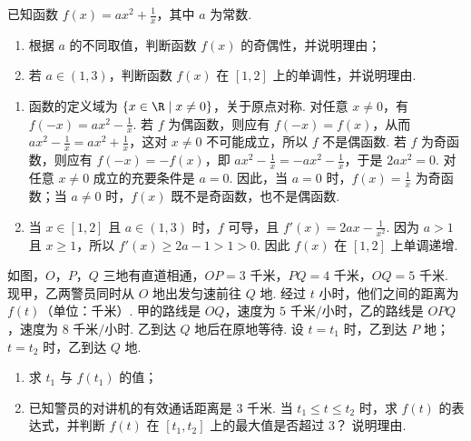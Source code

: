 \begin{problem}
已知函数 \( f(x) = ax^2 + \frac{1}{x} \)，其中 \( a \) 为常数.
\begin{enumerate}
\item 根据 \(a\) 的不同取值，判断函数 \(f(x)\) 的奇偶性，并说明理由；
\item 若 \(a \in (1,3)\)，判断函数 \(f(x)\) 在 \([1,2]\) 上的单调性，并说明理由.
\end{enumerate}
\end{problem}

\begin{solution}
\begin{enumerate}
\item 函数的定义域为 \(\{x\in\R\mid x\neq0\}\)，关于原点对称. 对任意 \(x\neq0\)，有 \(f(-x)=ax^{2}-\frac{1}{x}\). 若 \(f\) 为偶函数，则应有 \(f(-x)=f(x)\)，从而 \(ax^{2}-\frac{1}{x}=ax^{2}+\frac{1}{x}\)，这对 \(x\neq0\) 不可能成立，所以 \(f\) 不是偶函数. 若 \(f\) 为奇函数，则应有 \(f(-x)=-f(x)\)，即 \(ax^{2}-\frac{1}{x}=-ax^{2}-\frac{1}{x}\)，于是 \(2ax^{2}=0\). 对任意 \(x\neq0\) 成立的充要条件是 \(a=0\). 因此，当 \(a=0\) 时，\(f(x)=\frac{1}{x}\) 为奇函数；当 \(a\neq0\) 时，\(f(x)\) 既不是奇函数，也不是偶函数.
\item 当 \(x\in[1,2]\) 且 \(a\in(1,3)\) 时，\(f\) 可导，且 \(f'(x)=2ax-\frac{1}{x^{2}}\). 因为 \(a>1\) 且 \(x\geqslant1\)，所以 \(f'(x)\geqslant2a-1>1>0\). 因此 \(f(x)\) 在 \([1,2]\) 上单调递增.
\end{enumerate}
\end{solution}

\begin{problem}
如图，\(O\)，\(P\)，\(Q\) 三地有直道相通，\(OP = 3\text{ 千米}\)，\(PQ = 4\text{ 千米}\)，\(OQ = 5\text{ 千米}\). 现甲，乙两警员同时从 \(O\) 地出发匀速前往 \(Q\) 地. 经过 \(t\) 小时，他们之间的距离为 \(f(t)\)（单位：千米）. 甲的路线是 \(OQ\)，速度为 \(5\text{ 千米/小时}\)，乙的路线是 \(OPQ\)，速度为 \(8\text{ 千米/小时}\). 乙到达 \(Q\) 地后在原地等待. 设 \(t = t_1\) 时，乙到达 \(P\) 地；\(t = t_2\) 时，乙到达 \(Q\) 地.
\begin{enumerate}
\item 求 \( t_{1} \) 与 \( f(t_{1}) \) 的值；
\item 已知警员的对讲机的有效通话距离是 3 千米. 当 \(t_1 \leqslant t \leqslant t_2\) 时，求 \(f(t)\) 的表达式，并判断 \(f(t)\) 在 \([t_1, t_2]\) 上的最大值是否超过 3？ 说明理由.
\end{enumerate}

\FloatBarrier
\end{problem}

